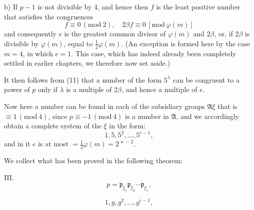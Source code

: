 b) If $p-1$ is not divisible by 4, and hence
then $f$ is the least positive number that satisfies the congruences
\[ f \equiv 0 \, (\mathrm{mod}\ 2), \quad 2\beta f \equiv 0 \, [\mathrm{mod}\ \varphi(m)] \]
and consequently $e$ is the greatest common divisor of $\varphi(m)$ and $2\beta$, or, if $2\beta$ is divisible by $\varphi(m)$, equal to $\tfrac{1}{2}\varphi(m)$. (An exception is formed here by the case $m=4$, in which $e=1$. This case, which has indeed already been completely settled in earlier chapters, we therefore now set aside.)

It then follows from (11) that a number of the form $5^\lambda$ can be congruent to a power of $p$ only if $\lambda$ is a multiple of $2\beta$, and hence a multiple of $e$.

Now here a number can be found in each of the subsidiary groups $\mathfrak{A}\xi$ that is $\equiv 1 \, (\mathrm{mod}\ 4)$, since $p \equiv -1 \, (\mathrm{mod}\ 4)$ is a number in $\mathfrak{A}$, and we accordingly obtain a complete system of the $\xi$ in the form:
\[ 1, 5, 5^2, \ldots, 5^{e-1}, \]
and in it $e$ is at most $= \tfrac{1}{2}\varphi(m) = 2^{\varkappa-2}$.

We collect what has been proved in the following theorem:

III. 
\[ p = \mathfrak{p}_{\xi_1} \mathfrak{p}_{\xi_2} \cdots \mathfrak{p}_{\xi_e}, \]

\[ 1, g, g^2, \ldots, g^{e-1}, \]
